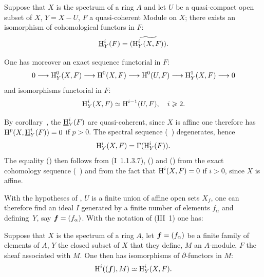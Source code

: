 \begin{supcorollary} \label{II.4}
Suppose that $X$ is the spectrum of a ring $A$ and let $U$ be a quasi-compact open subset of $X$, $Y=X-U$, $F$ a quasi-coherent Module on $X$; there exists an isomorphism of cohomological functors in $F$:
\begin{equation} \label{eq:II.4.1} {\operatorname{\underline{H}}}_Y^i(F) = \widetilde{(\operatorname{H}_Y^i(X, F))}.
\end{equation}

One has moreover an exact sequence functorial in $F$:
\begin{equation} \label{eq:II.4.2}
0 \to \H_Y^0(X, F) \to \H^0(X, F) \to \H^0(U, F) \to \H_Y^1(X, F) \to 0
\end{equation}
and isomorphisms functorial in $F$:
\begin{equation} \label{eq:II.4.3}
\operatorname{H}_Y^i(X, F) \simeq \operatorname{H}^{i-1}(U, F), \quad i\geqslant 2.
\end{equation}
\end{supcorollary}

By corollary~, the ${\operatorname{\underline{H}}}_Y^i(F)$ are quasi-coherent, since $X$ is affine one therefore has $\operatorname{H}^p(X, {\operatorname{\underline{H}}}_Y^i(F))=0$ if $p>0$. The spectral sequence (~) degenerates, hence
\[
\operatorname{H}_Y^i(X, F) = \Gamma({\operatorname{\underline{H}}}_Y^i(F)).
\]
The equality () then follows from (\EGA I~1.1.3.7), () and () from the exact cohomology sequence (~) and from the fact that $\operatorname{H}^i(X, F)=0$ if $i>0$, since $X$ is affine.

With the hypotheses of , $U$ is a finite union of affine open sets $X_f$, one can therefore find an ideal $I$ generated by a finite number of elements $f_{\alpha}$ and defining~$Y$, say $\boldsymbol{f}=(f_{\alpha})$. With the notation of (\EGA III~1) one has:

\begin{supproposition} \label{II.5}
Suppose that $X$ is the spectrum of a ring $A$, let $\boldsymbol{f}=(f_{\alpha})$ be a finite family of elements of $A$, $Y$ the closed subset of $X$ that they define, $M$ an $A$-module, $F$ the sheaf associated with $M$. One then has isomorphisms of $\partial$-functors in $M$:
\begin{equation} \label{eq:II.5.1} \operatorname{H}^i((\boldsymbol{f}), M) \simeq \operatorname{H}_Y^i(X, F).
\end{equation}
\end{supproposition}

